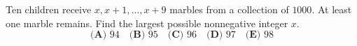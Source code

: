 Ten children receive $x,x+1,\ldots,x+9$ marbles from a collection of $1000$. At least one marble remains. Find the largest possible nonnegative integer $x$.
\[\textbf{(A) }94\quad\textbf{(B) }95\quad\textbf{(C) }96\quad\textbf{(D) }97\quad\textbf{(E) }98\]

